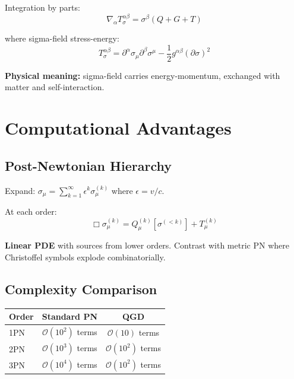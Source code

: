 \documentclass[11pt,a4paper]{article}
\theoremstyle{definition}
\theoremstyle{remark}
\begin{document}
		Integration by parts:
		\begin{equation}
			\nabla_\alpha T_\sigma^{\alpha\beta} = \sigma^\beta(Q + G + T)
		\end{equation}
		
		where sigma-field stress-energy:
		\begin{equation}
			T_\sigma^{\alpha\beta} = \partial^\alpha\sigma_\mu\partial^\beta\sigma^\mu - \frac{1}{2}g^{\alpha\beta}(\partial\sigma)^2
		\end{equation}
		
		\textbf{Physical meaning:} sigma-field carries energy-momentum, exchanged with matter and self-interaction.
		
		\section{Computational Advantages}
		
		\subsection{Post-Newtonian Hierarchy}
		
		Expand: $\sigma_\mu = \sum_{k=1}^\infty \epsilon^k\sigma_\mu^{(k)}$ where $\epsilon = v/c$.
		
		At each order:
		\begin{equation}
			\Box\sigma_\mu^{(k)} = Q_\mu^{(k)}[\sigma^{(<k)}] + T_\mu^{(k)}
		\end{equation}
		
		\textbf{Linear PDE} with sources from lower orders. Contrast with metric PN where Christoffel symbols explode combinatorially.
		
		\subsection{Complexity Comparison}
		
		\begin{center}
			\begin{tabular}{@{}lcc@{}}
				\toprule
				\textbf{Order} & \textbf{Standard PN} & \textbf{QGD}\\
				\midrule
				1PN & $\mathcal{O}(10^2)$ terms & $\mathcal{O}(10)$ terms\\
				2PN & $\mathcal{O}(10^3)$ terms & $\mathcal{O}(10^2)$ terms\\
				3PN & $\mathcal{O}(10^4)$ terms & $\mathcal{O}(10^2)$ terms\\
				\bottomrule
			\end{tabular}
		\end{center}
		
\end{document}
